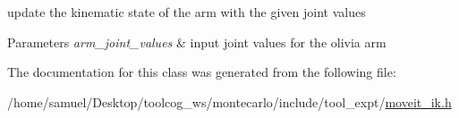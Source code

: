 update the kinematic state of the arm with the given joint values 


\begin{DoxyParams}{Parameters}
{\em arm\+\_\+joint\+\_\+values} & input joint values for the olivia arm \\
\hline
\end{DoxyParams}


The documentation for this class was generated from the following file\+:\begin{DoxyCompactItemize}
\item 
/home/samuel/\+Desktop/toolcog\+\_\+ws/montecarlo/include/tool\+\_\+expt/\hyperlink{moveit__ik_8h}{moveit\+\_\+ik.\+h}\end{DoxyCompactItemize}
